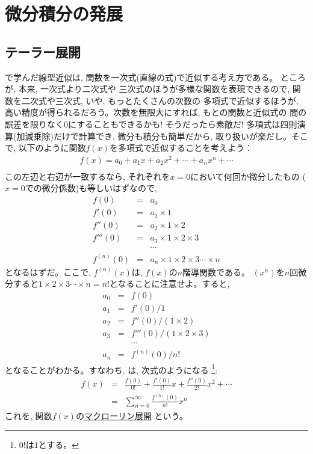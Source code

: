 \chapter{微分積分の発展}\label{chapt:calculus_app}

\section{テーラー展開}

で学んだ線型近似は, 関数を一次式(直線の式)で近似する考え方である。
ところが, 本来, 一次式より二次式や
三次式のほうが多様な関数を表現できるので, 関数を二次式や三次式, いや, もっとたくさんの次数の
多項式で近似するほうが, 高い精度が得られるだろう。次数を無限大にすれば, もとの関数と近似式の
間の誤差を限りなく0にすることもできるかも! そうだったら素敵だ! 多項式は四則演算(加減乗除)だけで計算でき, 
微分も積分も簡単だから, 取り扱いが楽だし。そこで, 以下のように関数$f(x)$を多項式で近似することを考えよう：
\begin{eqnarray}f(x)=a_0+a_1x+a_2x^2+\cdots+a_nx^n+\cdots\nonumber\\\label{eq:Taylor0}\end{eqnarray}
この左辺と右辺が一致するなら, それぞれを$x=0$において何回か微分したもの
($x=0$での微分係数)も等しいはずなので, 
\begin{eqnarray*}
f(0)&=&a_0\\
f'(0)&=&a_1\times1\\
f''(0)&=&a_2\times1\times2\\
f'''(0)&=&a_3\times1\times2\times3\\
&&\cdots\\
f^{(n)}(0)&=&a_n\times1\times2\times3\cdots\times n
\end{eqnarray*}
となるはずだ。ここで, $f^{(n)}(x)$は, $f(x)$の$n$階導関数である。
$(x^n)$を$n$回微分すると$1\times2\times3\cdots\times n=n!$となることに注意せよ。すると, 
\begin{eqnarray*}
a_0&=&f(0)\\
a_1&=&f'(0)/1\\
a_2&=&f''(0)/(1\times2)\\
a_3&=&f'''(0)/(1\times2\times3)\\
&&\cdots\\
a_n&=&f^{(n)}(0)/n!
\end{eqnarray*}
となることがわかる。すなわち, は, 次式のようになる
\footnote{$0!$は$1$とする。}:
\begin{eqnarray}
f(x)&=& \frac{f(0)}{0!}+\frac{f'(0)}{1!} x+\frac{f''(0)}{2!} x^2+\cdots\nonumber\\
&=&\sum^{\infty}_{n=0} \frac{f^{(n)}(0)}{n!}x^n\label{eq:macl}
\end{eqnarray}
これを, 関数$f(x)$の\underline{マクローリン展開} という。



